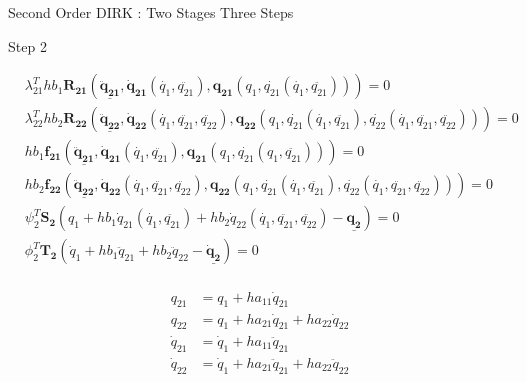\documentclass{beamer}
\begin{document}
\begin{frame}[allowframebreaks]{Second Order DIRK : Two Stages Three Steps}

\tiny{
  \begin{block}{Step 2}
    \begin{minipage}{1.0\textwidth}
      \begin{minipage}{0.7\textwidth}
        \begin{equation}\nonumber
          \begin{split}
            &\lambda_{21}^T h b_1 \mathbf{R_{21}}\left(\underline{\mathbf{\ddot{q}_{21}}},\mathbf{\dot{q}_{21}}(\dot{q_1},\ddot{q_{21}}),\mathbf{{q}_{21}}({q_1},\dot{q_{21}}(\dot{q_1},\ddot{q_{21}}))\right) = 0 \\
            &\lambda_{22}^T h b_2 \mathbf{R_{22}}\left(\underline{\mathbf{\ddot{q}_{22}}},\mathbf{\dot{q}_{22}}(\dot{q_1},\ddot{q_{21}},\ddot{q_{22}}),\mathbf{{q}_{22}}({q_1},\dot{q_{21}}(\dot{q_1},\ddot{q_{21}}),\dot{q_{22}}(\dot{q_1},\ddot{q_{21}},\ddot{q_{22}}))\right) = 0 \\
            &h b_1 \mathbf{f_{21}}\left(\underline{\mathbf{\ddot{q}_{21}}},\mathbf{\dot{q}_{21}}(\dot{q_1},\ddot{q_{21}}),\mathbf{{q}_{21}}({q_1},\dot{q_{21}}(q_1,\ddot{q_{21}}))\right) = 0 \\
            &h b_2 \mathbf{f_{22}}\left(\underline{\mathbf{\ddot{q}_{22}}},\mathbf{\dot{q}_{22}}(\dot{q_1},\ddot{q_{21}},\ddot{q_{22}}),\mathbf{{q}_{22}}({q_1},\dot{q_{21}}(\dot{q_1},\ddot{q_{21}}),\dot{q_{22}}(\dot{q_1},\ddot{q_{21}},\ddot{q_{22}}))\right) = 0 \\
            &\psi_2^T \mathbf{S_2}\left(q_1 + h b_1 \dot{q}_{21}(\dot{q_1},\ddot{q_{21}}) +  h b_2 \dot{q}_{22} (\dot{q_1},\ddot{q_{21}},\ddot{q_{22}}) - \underline{\mathbf{q_2}} \right) = 0\\
            &\phi_2^T \mathbf{T_2}\left(\dot{q}_1 + h b_1 \ddot{q}_{21} +  h b_2 \ddot{q}_{22} - \underline{\mathbf{\dot{q}_2}} \right) = 0 \\
          \end{split}
        \end{equation}
      \end{minipage}
      \begin{minipage}{0.3\textwidth}
        \begin{equation}\nonumber
          \begin{split}
            q_{21} &= q_1 + h a_{11} \dot{q}_{21} \\
            q_{22} &= q_1 + h a_{21} \dot{q}_{21} + h a_{22} \dot{q}_{22} \\
            \dot{q}_{21} &= \dot{q}_1 + h a_{11} \ddot{q}_{21} \\
            \dot{q}_{22} &= \dot{q}_1 + h a_{21} \ddot{q}_{21} + h a_{22} \ddot{q}_{22} \\
          \end{split}
        \end{equation}
      \end{minipage}
    \end{minipage}
  \end{block}

}
\end{frame}
\end{document}
